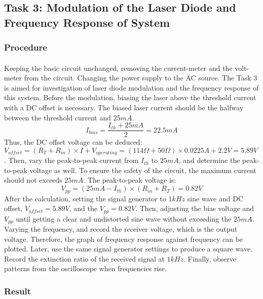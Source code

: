 \documentclass[12pt]{article}
\begin{document}
    
    
    \subsection{Task 3: Modulation of the Laser Diode and Frequency Response of System}
    \subsubsection{Procedure}
    \paragraph{}
    Keeping the basic circuit unchanged, removing the current-meter and the volt-meter from the circuit. Changing the power supply to the AC source. The Task 3 is aimed for investigation of laser diode modulation and the frequency response of this system. Before the modulation, biasing the laser above the threshold current with a DC offset is necessary. The biased laser current should be the halfway between the threshold current and 25$mA$.
    \begin{equation}
        I_{bias}=\frac{I_{th}+25mA}{2}=22.5mA
    \end{equation}
    Thus, the DC offset voltage can be deduced: $V_{offset}=(R_{T}+R_{in})\times I+V_{operating}=(114\Omega+50\Omega)\times 0.0225A+2.2V=5.89V$. Then, vary the peak-to-peak current from $I_{th}$ to $25mA$, and determine the peak-to-peak voltage as well. To ensure the safety of the circuit, the maximum current should not exceeds $25mA$. The peak-to-peak voltage is:
    \begin{equation}
        V_{pp}=(25mA-I_{th})\times (R_{in}+R_{T})=0.82V
    \end{equation}
    After the calculation, setting the signal generator to $1kHz$ sine wave and DC offset, $V_{offset}=5.89V$, and the $V_{pp}=0.82V$. Then, adjusting the bias voltage and $V_{pp}$ until getting a clear and undistorted sine wave without exceeding the $25mA$. Varying the frequency, and record the receiver voltage, which is the output voltage. Therefore, the graph of frequency response against frequency can be plotted. Later, use the same signal generator settings to produce a square wave. Record the extinction ratio of the received signal at $1kHz$. Finally, observe patterns from the oscilloscope when frequencies rise.
    
    \subsubsection{Result}
\end{document}
